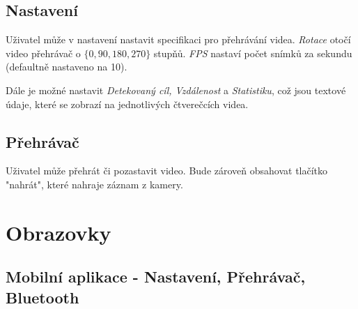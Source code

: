 \documentclass[12pt,a4paper]{article}
\begin{document}
\subsection{Nastavení}
Uživatel může v nastavení nastavit specifikaci pro přehrávání videa.
\textit{Rotace} otočí video přehrávač o $ \{0, 90, 180, 270\}$ stupňů. \textit{FPS} nastaví počet snímků za sekundu (defaultně nastaveno na 10).

Dále je možné nastavit \textit{Detekovaný cíl, Vzdálenost} a \textit{Statistiku}, což jsou textové údaje, které se zobrazí na jednotlivých čtverečcích videa.

\subsection{Přehrávač}
Uživatel může přehrát či pozastavit video. Bude zároveň obsahovat tlačítko "nahrát", které nahraje záznam z kamery.

\newpage
\section{Obrazovky}

\subsection{Mobilní aplikace - Nastavení, Přehrávač, Bluetooth}
\end{document}
